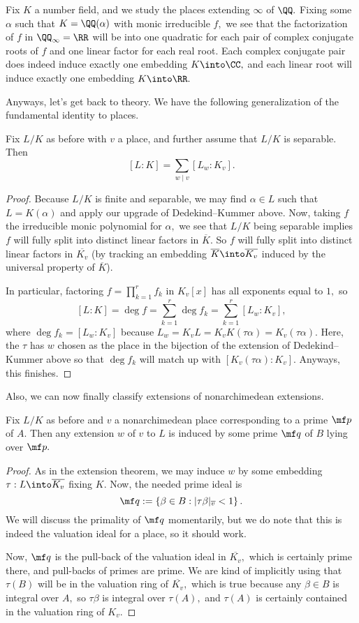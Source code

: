 \documentclass[../notes.tex]{subfiles}
\begin{document}
\begin{example}
	Fix $K$ a number field, and we study the places extending $\infty$ of $\QQ.$ Fixing some $\alpha$ such that $K=\QQ(\alpha)$ with monic irreducible $f,$ we see that the factorization of $f$ in $\QQ_\infty=\RR$ will be into one quadratic for each pair of complex conjugate roots of $f$ and one linear factor for each real root. Each complex conjugate pair does indeed induce exactly one embedding $K\into\CC,$ and each linear root will induce exactly one embedding $K\into\RR.$
\end{example}
Anyways, let's get back to theory. We have the following generalization of the fundamental identity to places.
\begin{proposition}
	Fix $L/K$ as before with $v$ a place, and further assume that $L/K$ is separable. Then
	\[[L:K]=\sum_{w\mid v}[L_w:K_v].\]
\end{proposition}
\begin{proof}
	Because $L/K$ is finite and separable, we may find $\alpha\in L$ such that $L=K(\alpha)$ and apply our upgrade of Dedekind--Kummer above. Now, taking $f$ the irreducible monic polynomial for $\alpha,$ we see that $L/K$ being separable implies $f$ will fully split into distinct linear factors in $\overline K.$ So $f$ will fully split into distinct linear factors in $\overline{K_v}$ (by tracking an embedding $\overline K\into\overline{K_v}$ induced by the universal property of $\overline K$).

	In particular, factoring $f=\prod_{k=1}^rf_k$ in $K_v[x]$ has all exponents equal to $1,$ so
	\[[L:K]=\deg f=\sum_{k=1}^r\deg f_k=\sum_{k=1}^r[L_w:K_v],\]
	where $\deg f_k=[L_w:K_v]$ because $L_w=K_vL=K_vK(\tau\alpha)=K_v(\tau\alpha).$ Here, the $\tau$ has $w$ chosen as the place in the bijection of the extension of Dedekind--Kummer above so that $\deg f_k$ will match up with $[K_v(\tau\alpha):K_v].$ Anyways, this finishes.
\end{proof}
Also, we can now finally classify extensions of nonarchimedean extensions.
\begin{proposition}
	Fix $L/K$ as before and $v$ a nonarchimedean place corresponding to a prime $\mf p$ of $A.$ Then any extension $w$ of $v$ to $L$ is induced by some prime $\mf q$ of $B$ lying over $\mf p.$
\end{proposition}
\begin{proof}
	As in the extension theorem, we may induce $w$ by some embedding $\tau:L\into\overline{K_v}$ fixing $K.$ Now, the needed prime ideal is
	\[\mf q:=\left\{\beta\in B:|\tau\beta|_{\overline v}<1\right\}.\]
	We will discuss the primality of $\mf q$ momentarily, but we do note that this is indeed the valuation ideal for a place, so it should work.

	Now, $\mf q$ is the pull-back of the valuation ideal in $\overline{K_v},$ which is certainly prime there, and pull-backs of primes are prime. We are kind of implicitly using that $\tau(B)$ will be in the valuation ring of $\overline{K_v},$ which is true because any $\beta\in B$ is integral over $A,$ so $\tau\beta$ is integral over $\tau(A),$ and $\tau(A)$ is certainly contained in the valuation ring of $K_v.$
\end{proof}
\end{document}
